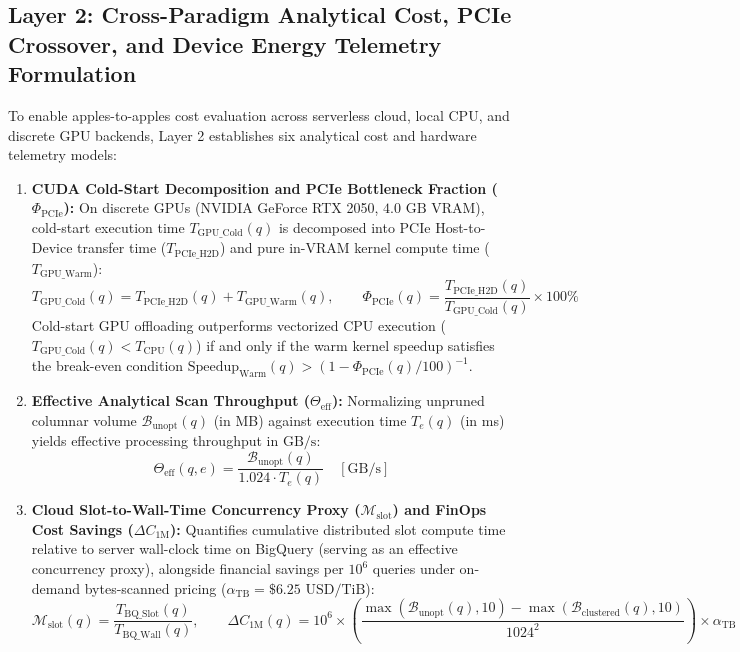 \documentclass[10pt,a4paper]{article}
\begin{document}
\subsection{Layer 2: Cross-Paradigm Analytical Cost, PCIe Crossover, and Device Energy Telemetry Formulation}
To enable apples-to-apples cost evaluation across serverless cloud, local CPU, and discrete GPU backends, Layer 2 establishes six analytical cost and hardware telemetry models:
\begin{enumerate}[leftmargin=1.5em,itemsep=3pt]
    \item \textbf{CUDA Cold-Start Decomposition and PCIe Bottleneck Fraction ($\Phi_{\text{PCIe}}$):} On discrete GPUs (NVIDIA GeForce RTX 2050, $4.0\text{ GB}$ VRAM), cold-start execution time $T_{\text{GPU\_Cold}}(q)$ is decomposed into PCIe Host-to-Device transfer time ($T_{\text{PCIe\_H2D}}$) and pure in-VRAM kernel compute time ($T_{\text{GPU\_Warm}}$):
    \begin{equation}
        T_{\text{GPU\_Cold}}(q) = T_{\text{PCIe\_H2D}}(q) + T_{\text{GPU\_Warm}}(q), \qquad \Phi_{\text{PCIe}}(q) = \frac{T_{\text{PCIe\_H2D}}(q)}{T_{\text{GPU\_Cold}}(q)} \times 100\%
    \end{equation}
    Cold-start GPU offloading outperforms vectorized CPU execution ($T_{\text{GPU\_Cold}}(q) < T_{\text{CPU}}(q)$) if and only if the warm kernel speedup satisfies the break-even condition $\text{Speedup}_{\text{Warm}}(q) > (1 - \Phi_{\text{PCIe}}(q)/100)^{-1}$.
    \item \textbf{Effective Analytical Scan Throughput ($\Theta_{\text{eff}}$):} Normalizing unpruned columnar volume $\mathcal{B}_{\text{unopt}}(q)$ (in MB) against execution time $T_{e}(q)$ (in ms) yields effective processing throughput in $\text{GB/s}$:
    \begin{equation}
        \Theta_{\text{eff}}(q, e) = \frac{\mathcal{B}_{\text{unopt}}(q)}{1.024 \cdot T_{e}(q)} \quad [\text{GB/s}]
    \end{equation}
    \item \textbf{Cloud Slot-to-Wall-Time Concurrency Proxy ($\mathcal{M}_{\text{slot}}$) and FinOps Cost Savings ($\Delta C_{\text{1M}}$):} Quantifies cumulative distributed slot compute time relative to server wall-clock time on BigQuery (serving as an effective concurrency proxy), alongside financial savings per $10^6$ queries under on-demand bytes-scanned pricing ($\alpha_{\text{TB}} = \$6.25\text{ USD/TiB}$):
    \begin{equation}
        \mathcal{M}_{\text{slot}}(q) = \frac{T_{\text{BQ\_Slot}}(q)}{T_{\text{BQ\_Wall}}(q)}, \qquad \Delta C_{\text{1M}}(q) = 10^6 \times \left( \frac{\max(\mathcal{B}_{\text{unopt}}(q), 10) - \max(\mathcal{B}_{\text{clustered}}(q), 10)}{1024^2} \right) \times \alpha_{\text{TB}}

\end{equation}
\end{enumerate}
\end{document}
